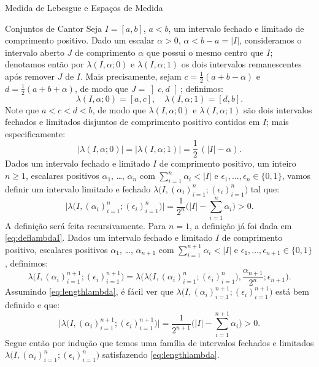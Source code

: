 \documentclass[oneside,final,11pt]{amsbook}
\theoremstyle{remark}\newtheorem{exercise}{Exercício}[chapter]
\theoremstyle{remark}\newtheorem{*exercise}[exercise]{\hbox to 0pt{\hskip 0pt minus 1fil*}Exercício}
\theoremstyle{definition}\newtheorem{exdefin}{Definição}[chapter]
\theoremstyle{plain}\newtheorem{teo}{Teorema}[section]
\theoremstyle{plain}\newtheorem{lem}[teo]{Lema}
\theoremstyle{plain}\newtheorem{prop}[teo]{Proposição}
\theoremstyle{plain}\newtheorem{cor}[teo]{Corolário}
\theoremstyle{definition}\newtheorem{defin}[teo]{Definição}
\theoremstyle{remark}\newtheorem{rem}[teo]{Observação}
\theoremstyle{definition}\newtheorem{notation}[teo]{Notação}
\theoremstyle{definition}\newtheorem{convention}[teo]{Convenção}
\theoremstyle{definition}\newtheorem{example}[teo]{Exemplo}
\numberwithin{section}{chapter}
\numberwithin{equation}{section}
\begin{document}
\begin{chapter}{Medida de Lebesgue e Espaços de Medida}
\begin{section}{Conjuntos de Cantor}
Seja $I=[a,b]$, $a<b$, um intervalo fechado e limitado de comprimento positivo.
Dado um escalar $\alpha>0$, $\alpha<b-a=\vert I\vert$, consideramos o intervalo aberto $J$ de comprimento $\alpha$
que possui o mesmo centro que $I$; denotamos então por $\lambda(I,\alpha;0)$ e $\lambda(I,\alpha;1)$ os dois
intervalos remanescentes após remover $J$ de $I$. Mais precisamente, sejam $c=\frac12(a+b-\alpha)$ e $d=\frac12(a+b+\alpha)$,
de modo que $J=\left]c,d\right[$; definimos:
\begin{equation}\label{eq:deflambdaI}
\lambda(I,\alpha;0)=[a,c],\quad\lambda(I,\alpha;1)=[d,b].
\end{equation}
Note que $a<c<d<b$, de modo que $\lambda(I,\alpha;0)$ e $\lambda(I,\alpha;1)$ são dois intervalos
fechados e limitados disjuntos de comprimento positivo contidos em $I$; mais especificamente:
\[\big\vert\lambda(I,\alpha;0)\big\vert=\big\vert\lambda(I,\alpha;1)\big\vert=\frac12\,(\vert I\vert-\alpha).\]
Dados um intervalo fechado e limitado $I$ de comprimento positivo, um inteiro
$n\ge1$, escalares positivos $\alpha_1$, \dots, $\alpha_n$ com $\sum_{i=1}^n\alpha_i<\vert I\vert$
e $\epsilon_1,\ldots,\epsilon_n\in\{0,1\}$, vamos definir um intervalo limitado e fechado
$\lambda\big(I,(\alpha_i)_{i=1}^n;(\epsilon_i)_{i=1}^n\big)$ tal que:
\begin{equation}\label{eq:lengthlambda}
\Big\vert\lambda\big(I,(\alpha_i)_{i=1}^n;(\epsilon_i)_{i=1}^n\big)\Big\vert=
\frac1{2^n}\Big(\vert I\vert-\sum_{i=1}^n\alpha_i\Big)>0.
\end{equation}
A definição será feita recursivamente. Para $n=1$, a definição já foi dada em \eqref{eq:deflambdaI}.
Dados um intervalo fechado e limitado $I$ de comprimento positivo, escalares positivos
$\alpha_1$, \dots, $\alpha_{n+1}$ com $\sum_{i=1}^{n+1}\alpha_i<\vert I\vert$
e $\epsilon_1,\ldots,\epsilon_{n+1}\in\{0,1\}$, definimos:
\[\lambda\big(I,(\alpha_i)_{i=1}^{n+1};(\epsilon_i)_{i=1}^{n+1}\big)=\lambda\Big(\lambda\big(I,
(\alpha_i)_{i=1}^n;(\epsilon_i)_{i=1}^n\big),\frac{\alpha_{n+1}}{2^n};\epsilon_{n+1}\Big).\]
Assumindo \eqref{eq:lengthlambda}, é fácil ver que $\lambda\big(I,(\alpha_i)_{i=1}^{n+1};(\epsilon_i)_{i=1}^{n+1}\big)$
está bem definido e que:
\[\Big\vert\lambda\big(I,(\alpha_i)_{i=1}^{n+1};(\epsilon_i)_{i=1}^{n+1}\big)\Big\vert=
\frac1{2^{n+1}}\Big(\vert I\vert-\sum_{i=1}^{n+1}\alpha_i\Big)>0.\]
Segue então por indução que temos uma família de intervalos fechados e limitados
$\lambda\big(I,(\alpha_i)_{i=1}^n;(\epsilon_i)_{i=1}^n\big)$ satisfazendo \eqref{eq:lengthlambda}.


\end{section}
\end{chapter}
\end{document}
